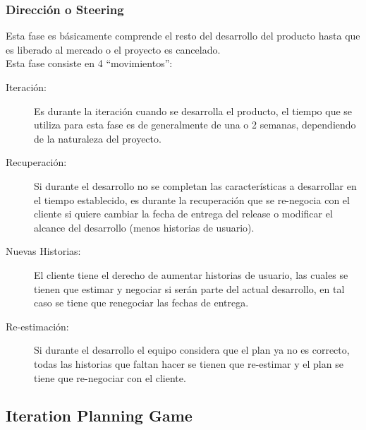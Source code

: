           \subsubsection{Dirección o Steering}
          \label{subs:steering}

          Esta fase es básicamente comprende el resto del desarrollo del producto hasta que es liberado al mercado o el proyecto es cancelado.\\

          Esta fase consiste en 4 ``movimientos'':

          \begin{description}
            \item[Iteración:] Es durante la iteración cuando se desarrolla el producto, el tiempo que se utiliza para esta fase es de generalmente de una o 2 semanas, dependiendo de la naturaleza del proyecto.

            \item[Recuperación:] Si durante el desarrollo no se completan las características a desarrollar en el tiempo establecido, es durante la recuperación que se re-negocia con el cliente si quiere cambiar la fecha de entrega del release o modificar el alcance del desarrollo (menos historias de usuario).

            \item[Nuevas Historias:] El cliente tiene el derecho de aumentar historias de usuario, las cuales se tienen que estimar y negociar si serán parte del actual desarrollo, en tal caso se tiene que renegociar las fechas de entrega.

            \item[Re-estimación:] Si durante el desarrollo el equipo considera que el plan ya no es correcto, todas las historias que faltan hacer se tienen que re-estimar y el plan se tiene que re-negociar con el cliente.
          \end{description}


          \subsection{Iteration Planning Game}
          \label{sub:iteracion}


